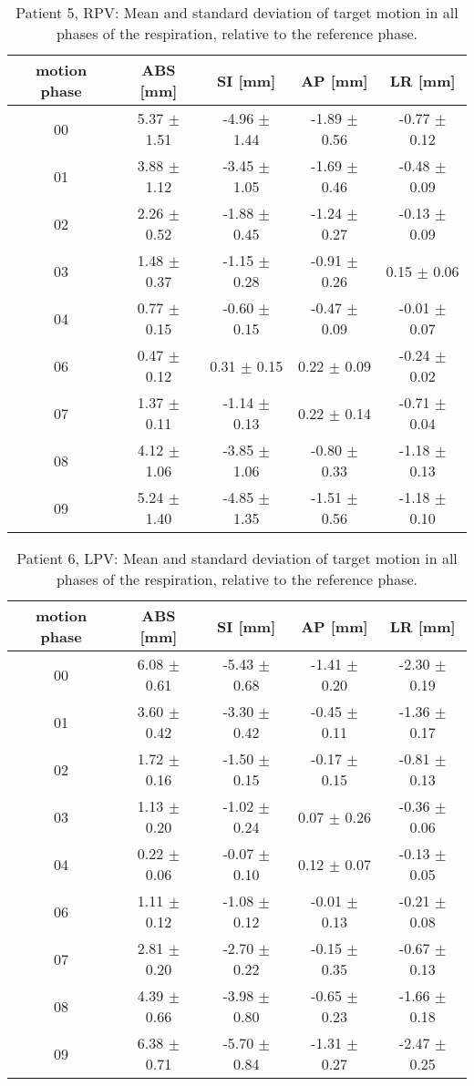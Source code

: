 \begin{table}[H]
  \centering
  \caption{Patient 5, RPV: Mean and standard deviation of target motion in all phases of the respiration, relative to the reference phase.}
  \begin{tabular}{|c|c|c|c|c|}
    \hline\hline
    motion phase & ABS [mm] & SI [mm] & AP [mm] & LR [mm]\\
    \hline 
00& 5.37 $\pm$ 1.51& -4.96 $\pm$ 1.44& -1.89 $\pm$ 0.56& -0.77 $\pm$ 0.12 \\
01& 3.88 $\pm$ 1.12& -3.45 $\pm$ 1.05& -1.69 $\pm$ 0.46& -0.48 $\pm$ 0.09 \\
02& 2.26 $\pm$ 0.52& -1.88 $\pm$ 0.45& -1.24 $\pm$ 0.27& -0.13 $\pm$ 0.09 \\
03& 1.48 $\pm$ 0.37& -1.15 $\pm$ 0.28& -0.91 $\pm$ 0.26& 0.15 $\pm$ 0.06 \\
04& 0.77 $\pm$ 0.15& -0.60 $\pm$ 0.15& -0.47 $\pm$ 0.09& -0.01 $\pm$ 0.07 \\
06& 0.47 $\pm$ 0.12& 0.31 $\pm$ 0.15& 0.22 $\pm$ 0.09& -0.24 $\pm$ 0.02 \\
07& 1.37 $\pm$ 0.11& -1.14 $\pm$ 0.13& 0.22 $\pm$ 0.14& -0.71 $\pm$ 0.04 \\
08& 4.12 $\pm$ 1.06& -3.85 $\pm$ 1.06& -0.80 $\pm$ 0.33& -1.18 $\pm$ 0.13 \\
09& 5.24 $\pm$ 1.40& -4.85 $\pm$ 1.35& -1.51 $\pm$ 0.56& -1.18 $\pm$ 0.10 \\
        \hline\hline
  \end{tabular}
\end{table}


\begin{table}[H]
  \centering
  \caption{Patient 6, LPV: Mean and standard deviation of target motion in all phases of the respiration, relative to the reference phase.}
  \begin{tabular}{|c|c|c|c|c|}
    \hline\hline
    motion phase & ABS [mm] & SI [mm] & AP [mm] & LR [mm]\\
    \hline 
00& 6.08 $\pm$ 0.61& -5.43 $\pm$ 0.68& -1.41 $\pm$ 0.20& -2.30 $\pm$ 0.19 \\
01& 3.60 $\pm$ 0.42& -3.30 $\pm$ 0.42& -0.45 $\pm$ 0.11& -1.36 $\pm$ 0.17 \\
02& 1.72 $\pm$ 0.16& -1.50 $\pm$ 0.15& -0.17 $\pm$ 0.15& -0.81 $\pm$ 0.13 \\
03& 1.13 $\pm$ 0.20& -1.02 $\pm$ 0.24& 0.07 $\pm$ 0.26& -0.36 $\pm$ 0.06 \\
04& 0.22 $\pm$ 0.06& -0.07 $\pm$ 0.10& 0.12 $\pm$ 0.07& -0.13 $\pm$ 0.05 \\
06& 1.11 $\pm$ 0.12& -1.08 $\pm$ 0.12& -0.01 $\pm$ 0.13& -0.21 $\pm$ 0.08 \\
07& 2.81 $\pm$ 0.20& -2.70 $\pm$ 0.22& -0.15 $\pm$ 0.35& -0.67 $\pm$ 0.13 \\
08& 4.39 $\pm$ 0.66& -3.98 $\pm$ 0.80& -0.65 $\pm$ 0.23& -1.66 $\pm$ 0.18 \\
09& 6.38 $\pm$ 0.71& -5.70 $\pm$ 0.84& -1.31 $\pm$ 0.27& -2.47 $\pm$ 0.25 \\
        \hline\hline
  \end{tabular}
\end{table}

